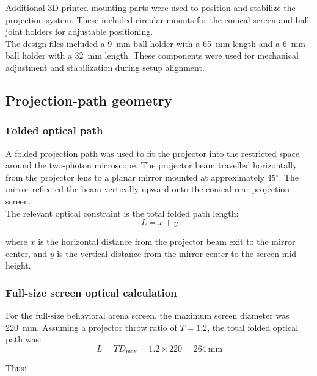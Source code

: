 Additional 3D-printed mounting parts were used to position and stabilize the projection system. These included circular mounts for the conical screen and ball-joint holders for adjustable positioning.\\

The design files included a 9~mm ball holder with a 65~mm length and a 6~mm ball holder with a 32~mm length. These components were used for mechanical adjustment and stabilization during setup alignment.\\

\subsection{Projection-path geometry}

\subsubsection{Folded optical path}

A folded projection path was used to fit the projector into the restricted space around the two-photon microscope. The projector beam travelled horizontally from the projector lens to a planar mirror mounted at approximately 45$^\circ$. The mirror reflected the beam vertically upward onto the conical rear-projection screen.\\

The relevant optical constraint is the total folded path length:\\

\[
L = x + y
\]

where $x$ is the horizontal distance from the projector beam exit to the mirror center, and $y$ is the vertical distance from the mirror center to the screen mid-height.\\

\subsubsection{Full-size screen optical calculation}

For the full-size behavioral arena screen, the maximum screen diameter was 220~mm. Assuming a projector throw ratio of $T=1.2$, the total folded optical path was:\\

\[
L = T D_{\max} = 1.2 \times 220 = 264~\mathrm{mm}
\]

Thus:\\

